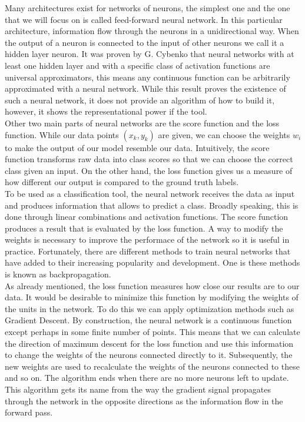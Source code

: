 Many architectures exist for networks of neurons, the simplest one and the one that we will focus on is called feed-forward neural network. In this particular architecture, information flow through the neurons in a unidirectional way. When the output of a neuron is connected to the input of other neurons we call it a hidden layer neuron. It was proven by G. Cybenko \cite{cybenko:mcss} that neural networks with at least one hidden layer and with a specific class of activation functions are universal approximators, this means any continuous function can be arbitrarily approximated with a neural network. While this result proves the existence of such a neural network, it does not provide an algorithm of how to build it, however, it shows the representational power if the tool.\\

Other two main parts of neural networks are the score function and the loss function. While our data points $(x_k, y_k)$ are given, we can choose the weights $w_i$ to make the output of our model resemble our data. Intuitively, the score function transforms raw data into class scores so that we can choose the correct class given an input. On the other hand, the loss function gives us a measure of how different our output is compared to the ground truth labels.
\\

To be used as a classification tool, the neural network receives the data as input and produces information that allows to predict a class. Broadly speaking, this is done through linear combinations and activation functions. The score function produces a result that is evaluated by the loss function. A way to modify the weights is necessary to improve the performace of the network so it is useful in practice. Fortunately, there are different methods to train neural networks that have added to their increasing popularity and development. One is these methods is known as backpropagation.\\

As already mentioned, the loss function measures how close our results are to our data. It would be desirable to minimize this function by modifying the weights of the units in the network. To do this we can apply optimization methods such as Gradient Descent. By construction, the neural network is a continuous function except perhaps in some finite number of points. This means that we can calculate the direction of maximum descent for the loss function and use this information to change the weights of the neurons connected directly to it. Subsequently, the new weights are used to recalculate the weights of the neurons connected to these and so on. The algorithm ends when there are no more neurons left to update. This algorithm gets its name from the way the gradient signal propagates through the network in the opposite directions as the information flow in the forward pass.\\

